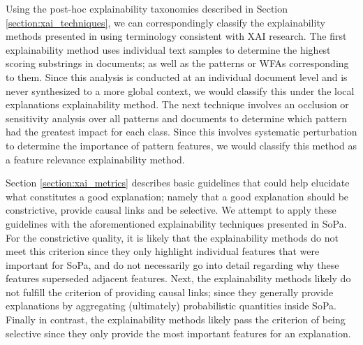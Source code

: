 Using the post-hoc explainability taxonomies described in Section
\ref{section:xai_techniques}, we can correspondingly classify the explainability
methods presented in \citet{schwartz2018sopa} using terminology consistent with
XAI research. The first explainability method uses individual text samples to
determine the highest scoring substrings in documents; as well as the patterns
or WFAs corresponding to them. Since this analysis is conducted at an individual
document level and is never synthesized to a more global context, we would
classify this under the local explanations explainability method. The next
technique involves an occlusion or sensitivity analysis over all patterns and
documents to determine which pattern had the greatest impact for each class.
Since this involves systematic perturbation to determine the importance of
pattern features, we would classify this method as a feature relevance
explainability method.

Section \ref{section:xai_metrics} describes basic guidelines that could help
elucidate what constitutes a good explanation; namely that a good explanation
should be constrictive, provide causal links and be selective. We attempt to
apply these guidelines with the aforementioned explainability techniques
presented in SoPa. For the constrictive quality, it is likely that the
explainability methods do not meet this criterion since they only highlight
individual features that were important for SoPa, and do not necessarily go into
detail regarding why these features superseded adjacent features. Next, the
explainability methods likely do not fulfill the criterion of providing causal
links; since they generally provide explanations by aggregating (ultimately)
probabilistic quantities inside SoPa. Finally in contrast, the explainability
methods likely pass the criterion of being selective since they only provide the
most important features for an explanation.


